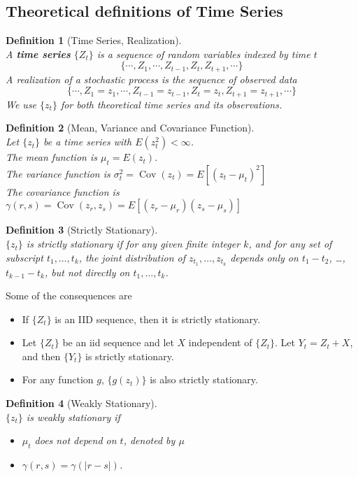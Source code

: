 \documentclass[12pt]{article}
\newtheorem{definition}{Definition}[section]
\theoremstyle{definition}
\DeclareMathOperator{\cov}{Cov}
\begin{document}
\subsection{Theoretical definitions of Time Series}
\begin{definition}[Time Series, Realization]
\hfill\\\normalfont A \textbf{time series} $\{Z_t\}$ is a sequence of random variables indexed by time $t$
\[
\{\cdots, Z_1, \cdots, Z_{t-1}, Z_t, Z_{t+1},\cdots\}
\]
A realization of a stochastic process is the sequence of observed data
\[
\{\cdots, Z_1=z_1,\cdots, Z_{t-1}=z_{t-1},Z_t=z_t, Z_{t+1}=z_{t+1},\cdots\}
\]
We use $\{z_t\}$ for both theoretical time series and its observations.
\end{definition}
\begin{definition}[Mean, Variance and Covariance Function]
\hfill\\\normalfont Let $\{z_t\}$ be a time series with $E(z_t^2)<\infty$.\\
The mean function is $\mu_t = E(z_t)$.\\
The variance function is $\sigma_t^2 = \cov(z_t) = E[(z_t-\mu_t)^2]$\\
The covariance function is $\gamma(r,s)=\cov(z_r, z_s)=E[(z_r-\mu_r)(z_s-\mu_s)]$
\end{definition}
\begin{definition}[Strictly Stationary]
\hfill\\\normalfont $\{z_t\}$ is strictly stationary if for any given finite integer $k$, and for any set of subscript $t_1,\ldots, t_k$, the joint distribution of $z_{t_1}, \ldots, z_{t_k}$ depends only on $t_1-t_2$, \ldots, $t_{k-1}-t_k$, but not directly on $t_1,\ldots, t_k$.
\end{definition}
Some of the consequences are
\begin{itemize}
  \item If $\{Z_t\}$ is an IID sequence, then it is strictly stationary.
  \item Let $\{Z_t\}$ be an iid sequence and let $X$ independent of $\{Z_t\}$. Let $Y_t = Z_t + X$, and then $\{Y_t\}$ is strictly stationary.
  \item For any function $g$, $\{g(z_t)\}$ is also strictly stationary.
\end{itemize}
\begin{definition}[Weakly Stationary]
\hfill\\\normalfont $\{z_t\}$ is weakly stationary if 
\begin{itemize}
  \item $\mu_t$ does not depend on $t$, denoted by $\mu$
  \item $\gamma(r,s)=\gamma(|r-s|)$. 
\end{itemize}
\end{definition}
\end{document}
